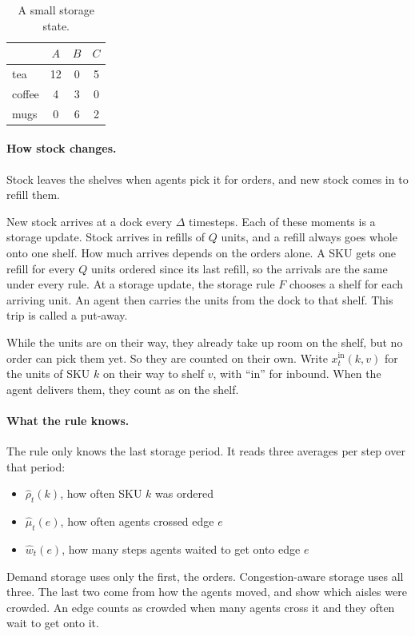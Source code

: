 \documentclass[11pt,a4paper]{article}
\newcommand{\new}[1]{\textcolor{newc}{#1}}
\begin{document}
\begin{table}[H]
\centering
\caption{A small storage state.}
\label{tab:storagematrix}
\begin{tabular}{lccc}
\toprule
 & \(A\) & \(B\) & \(C\)\\
\midrule
tea & 12 & 0 & 5\\
coffee & 4 & 3 & 0\\
mugs & 0 & 6 & 2\\
\bottomrule
\end{tabular}
\end{table}

\paragraph{How stock changes.}
Stock leaves the shelves when agents pick it for orders, and new stock
comes in to refill them.

New stock arrives at a dock every $\Delta$ timesteps. Each of these moments
is a storage update. \new{Stock arrives in refills of $Q$ units, and a refill
always goes whole onto one shelf. How much arrives depends on the orders
alone. A SKU gets one refill for every $Q$ units ordered since its last
refill, so the arrivals are the same under every rule.} At a storage update, the storage rule $F$ chooses a
shelf for each arriving unit. An agent then carries the units from the dock
to that shelf. This trip is called a put-away.

While the units are on their way, they already take up room on the shelf,
but no order can pick them yet. So they are counted on their own. Write
$x^{\mathrm{in}}_t(k,v)$ for the units of SKU $k$ on their way to shelf
$v$, with ``in'' for inbound. When the agent delivers them, they count as
on the shelf.

\paragraph{What the rule knows.}
The rule only knows the last storage period. It reads three averages per
step over that period:
\begin{itemize}
\item \(\hat\rho_t(k)\), how often SKU \(k\) was ordered
\item \(\hat\mu_t(e)\), how often agents crossed edge \(e\)
\item \(\hat w_t(e)\), how many steps agents waited to get onto edge \(e\)
\end{itemize}
Demand storage uses only the first, the orders. Congestion-aware storage
uses all three. The last two come from how the agents moved, and show which
aisles were crowded. An edge counts as crowded when many agents cross it
and they often wait to get onto it.
\end{document}

